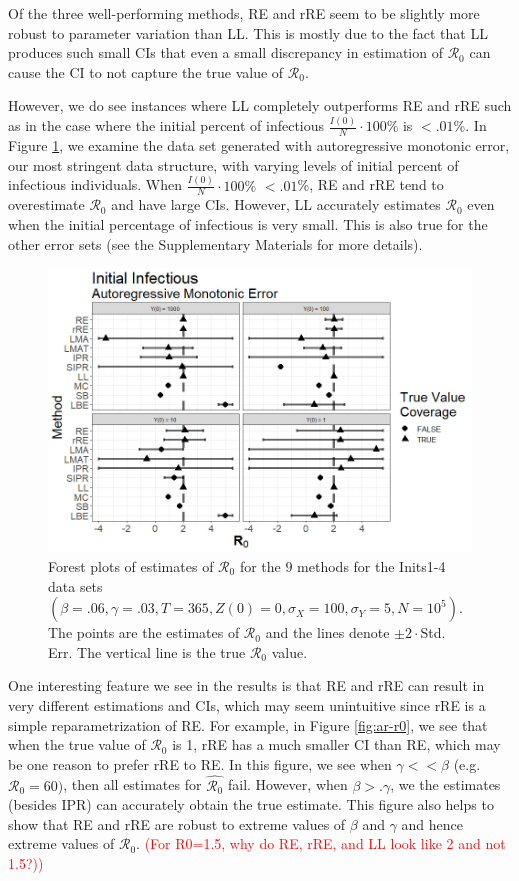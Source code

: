 \documentclass[12pt]{article}
\newcommand{\com}[1]{\textcolor{red}{ #1}}
\newcommand{\xxsir}{\ensuremath{9} } %
\newcommand{\rr}{\ensuremath{\mathcal{R}_0}}
\begin{document}
Of the three well-performing methods, RE and rRE seem to be slightly more robust to parameter variation than LL.  This is mostly due to the fact that LL produces such small CIs that even a small discrepancy in estimation of $\rr$ can cause the CI to not capture the true value of $\rr$.

However, we do see instances where LL completely outperforms RE and rRE such as in the case where the initial percent of infectious $\frac{I(0)}{N} \cdot 100\%$ is $< .01$\%. In Figure \ref{fig:ar-small-I}, we examine the data set generated with autoregressive monotonic error, our most stringent data structure, with varying levels of initial percent of infectious individuals.  When $\frac{I(0)}{N} \cdot 100\%$ $< .01$\%, RE and rRE tend to overestimate $\rr$ and have large CIs.  However, LL accurately estimates $\rr$ even when the initial percentage of infectious is very small.  This is also true for the other error sets (see the Supplementary Materials for more details).

\begin{figure}[H]
	\centering
	\includegraphics[scale=0.5]{images/start_arm.jpg}
	\caption{Forest plots of estimates of $\rr$ for the \xxsir methods for the Inits1-4 data sets $(\beta=.06, \gamma=.03, T=365,  Z(0)=0, \sigma_X=100, \sigma_Y=5, N=10^5)$.  The points are the estimates of $\rr$ and the lines denote $\pm 2\cdot $Std. Err.  The vertical line is the true $\rr$ value.}\label{fig:ar-small-I}
\end{figure}

One interesting feature we see in the results is that RE and rRE can result in very different estimations and CIs, which may seem unintuitive since rRE is a simple reparametrization of RE.  For example, in Figure \ref{fig:ar-r0}, we see that when the true value of $\rr$ is 1, rRE has a much smaller CI than RE, which may be one reason to prefer rRE to RE.  In this figure, we see when $\gamma << \beta$ (e.g. $\rr=60)$, then all estimates for $\hat{\rr}$ fail.  However, when $\beta >. \gamma$, we the estimates (besides IPR) can accurately obtain the true estimate. This figure also helps to show that RE and rRE are robust to extreme values of $\beta$ and $\gamma$ and hence extreme values of $\rr$.  \com{(For R0=1.5, why do RE, rRE, and LL look like 2 and not 1.5?))}
\end{document}
